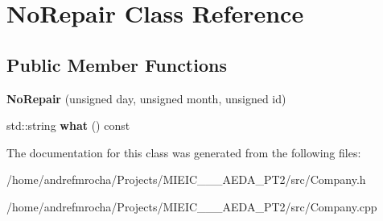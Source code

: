 \hypertarget{class_no_repair}{}\section{No\+Repair Class Reference}
\label{class_no_repair}
\subsection*{Public Member Functions}
\begin{DoxyCompactItemize}
\item 
\mbox{\label{class_no_repair_ac57223bb7d1e2ca4d3989fe7a19ab7ea}} 
{\bfseries No\+Repair} (unsigned day, unsigned month, unsigned id)
\item 
\mbox{\label{class_no_repair_a296f67d6f20788779f2c2fe344c1e618}} 
std\+::string {\bfseries what} () const
\end{DoxyCompactItemize}


The documentation for this class was generated from the following files\+:\begin{DoxyCompactItemize}
\item 
/home/andrefmrocha/\+Projects/\+M\+I\+E\+I\+C\+\_\+\_\+\_\+\+A\+E\+D\+A\+\_\+\+P\+T2/src/Company.\+h\item 
/home/andrefmrocha/\+Projects/\+M\+I\+E\+I\+C\+\_\+\_\+\_\+\+A\+E\+D\+A\+\_\+\+P\+T2/src/Company.\+cpp\end{DoxyCompactItemize}
